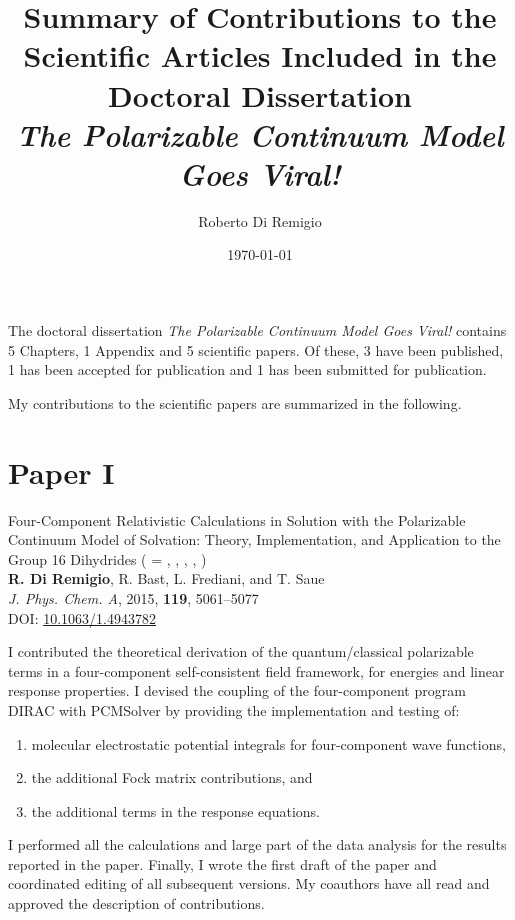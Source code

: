 \documentclass[notitlepage,a4paper,11pt,dvipsnames]{article}
\title{Summary of Contributions to the Scientific Articles Included in the Doctoral Dissertation \\ {\itshape The Polarizable Continuum Model Goes Viral!}}
\author{Roberto Di Remigio}
\date{\today}
\newcommand*{\paper}[1]{\textbf{Paper #1}}
\begin{document}
\maketitle

The doctoral dissertation {\itshape The Polarizable Continuum Model Goes
Viral!} contains 5 Chapters, 1 Appendix and 5 scientific papers. Of these, 3
have been published, 1 has been accepted for publication and 1 has been
submitted for publication.

My contributions to the scientific papers are summarized in the following.

\section*{\paper{I}}

\begin{tcolorbox}
  {\small
  \textsf{Four-Component Relativistic Calculations in Solution with the
  Polarizable Continuum Model of Solvation: Theory,
  Implementation, and Application to the Group 16 Dihydrides
   ( = , , , ,
  )
  }
  \\
  \textbf{R. Di Remigio}, R. Bast, L. Frediani, and T. Saue
  \\
  \textit{J. Phys. Chem. A}, \textrm{2015}, \textbf{119}, 5061--5077
  \\
  DOI: \url{10.1063/1.4943782}
  }
\end{tcolorbox}

I contributed the theoretical derivation of the quantum/classical polarizable
terms in a four-component self-consistent field framework, for energies and linear response
properties. I devised the coupling of the four-component program DIRAC with
PCMSolver by providing the implementation and testing of:
\begin{enumerate}
  \item molecular electrostatic potential integrals for four-component wave functions,
  \item the additional Fock matrix contributions, and
  \item the additional terms in the response equations.
\end{enumerate}
I performed all the calculations and large part of the data analysis
for the results reported in the paper.
Finally, I wrote the first draft of the paper and coordinated editing of
all subsequent versions.
My coauthors have all read and approved the description of contributions.
\end{document}
